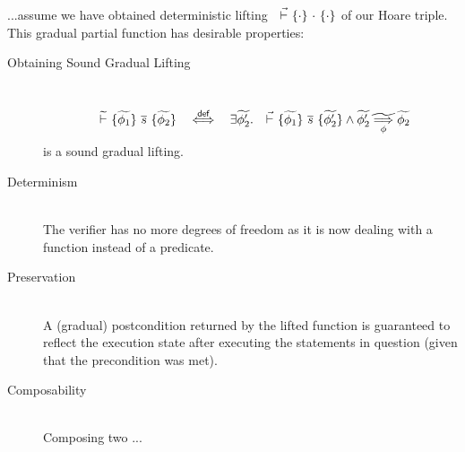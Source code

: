 ...assume we have obtained deterministic lifting ${~} \,\,\vec{\vdash}\,\, \{{\cdot}\} ~{\cdot}~ \{{\cdot}\}$ of our Hoare triple. %
This gradual partial function has desirable properties: %
\begin{description}
    \item[Obtaining Sound Gradual Lifting]
    \begin{lemma}~\\
        \begin{displaymath}
        {~} \,\,\widetilde{\vdash}\,\, \{{\widetilde{\phi_1}}\} ~{\overline{s}}~ \{{\widetilde{\phi_2}}\} ~~\overset{\textsf{def}}{\iff}~~ \exists \widetilde{\phi_2'}.~ {~} \,\,\vec{\vdash}\,\, \{{\widetilde{\phi_1}}\} ~{\overline{s}}~ \{{\widetilde{\phi_2'}}\} \wedge {\widetilde{\phi_2'}} \underset{\phi}{\widetilde{\implies}} {\widetilde{\phi_2}}
        \end{displaymath}
        is a sound gradual lifting.
    \end{lemma}
    
    \item[Determinism]~\\
    The verifier has no more degrees of freedom as it is now dealing with a function instead of a predicate. %
    \item[Preservation]~\\
    A (gradual) postcondition returned by the lifted function is guaranteed to reflect the execution state after executing the statements in question (given that the precondition was met).
    \item[Composability]~\\
    Composing two ...
\end{description}


